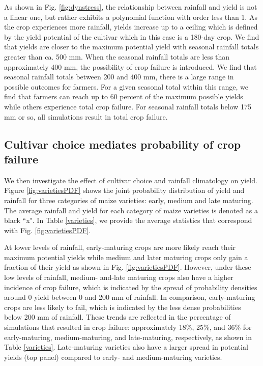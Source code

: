 As shown in Fig. \ref{fig:dynstress}, the relationship between rainfall and yield is not a linear one, but rather exhibits a polynomial function with order less than 1. As the crop experiences more rainfall, yields increase up to a ceiling which is defined by the yield potential of the cultivar which in this case is a 180-day crop. We find that yields are closer to the maximum potential yield with seasonal rainfall totals greater than ca. 500 mm. When the seasonal rainfall totals are less than approximately 400 mm, the possibility of crop failure is introduced. We find that seasonal rainfall totals between 200 and 400 mm, there is a large range in possible outcomes for farmers. For a given seasonal total within this range, we find that farmers can reach up to 60 percent of the maximum possible yields while others experience total crop failure. For seasonal rainfall totals below 175 mm or so, all simulations result in total crop failure.

\subsection{Cultivar choice mediates probability of crop failure} \label{cultivar_choice}

We then investigate the effect of cultivar choice and rainfall climatology on yield. Figure \ref{fig:varietiesPDF} shows the joint probability distribution of yield and rainfall for three categories of maize varieties: early, medium and late maturing. The average rainfall and yield for each category of maize varieties is denoted as a black ``x". In Table \ref{varieties}, we provide the average statistics that correspond with Fig. \ref{fig:varietiesPDF}.

At lower levels of rainfall, early-maturing crops are more likely reach their maximum potential yields while medium and later maturing crops only gain a fraction of their yield as shown in Fig. \ref{fig:varietiesPDF}. However, under these low levels of rainfall, medium- and-late maturing crops also have a higher incidence of crop failure, which is indicated by the spread of probability densities around 0 yield between 0 and 200 mm of rainfall. In comparison, early-maturing crops are less likely to fail, which is indicated by the less dense probabilities below 200 mm of rainfall. These trends are reflected in the percentage of simulations that resulted in crop failure: approximately 18\%, 25\%, and 36\% for early-maturing, medium-maturing, and late-maturing, respectively, as shown in Table \ref{varieties}. Late-maturing varieties also have a larger spread in potential yields (top panel) compared to early- and medium-maturing varieties.

